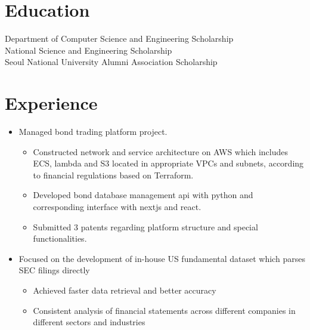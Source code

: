 \documentclass[11pt,a4paper,sans]{moderncv}        %
\begin{document}
\makecvtitle%
\vspace*{-10mm}

\section{Education}
{Department of Computer Science and Engineering Scholarship\\
National Science and Engineering Scholarship\\
Seoul National University Alumni Association Scholarship}

\section{Experience}
{\begin{itemize}%
    \item Managed bond trading platform project.
        \begin{itemize}%
            \item Constructed network and service architecture on AWS which includes ECS, lambda and S3 located in appropriate VPCs and subnets, according to financial regulations based on Terraform.
            \item Developed bond database management api with python and corresponding interface with nextjs and react.
            \item Submitted 3 patents regarding platform structure and special functionalities.
        \end{itemize}
\end{itemize}}

{\begin{itemize}%
    \item Focused on the development of in-house US fundamental dataset which parses SEC filings directly
        \begin{itemize}%
            \item Achieved faster data retrieval and better accuracy
            \item Consistent analysis of financial statements across different companies in different sectors and industries
        \end{itemize}
\end{itemize}}
\end{document}
